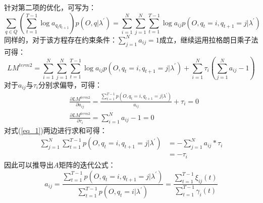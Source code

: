 \documentclass[UTF8, 12pt]{ctexart}
\begin{document}
	针对第二项的优化，可写为：
	\begin{equation}
		\sum_{q \in Q} ({\sum_{t=1}^{T-1}{\log a_{q_{t}q_{t+1}}}})p(O,q|\lambda^{'}) = \sum_{i=1}^{N} \sum_{j=1}^{N} \sum_{t=1}^{T-1}\log a_{ij} p(O, q_{t}=i, q_{t+1}=j|\lambda^{'})
	\end{equation}
	同样的，对于该方程存在约束条件：$\sum_{j=1}^{N} a_{ij}=1$成立，继续运用拉格朗日乘子法可得：
	\begin{equation}
		LM^{term2} = \sum_{i=1}^{N} \sum_{j=1}^{N} \sum_{t=1}^{T-1}\log a_{ij} p(O, q_{t}=i, q_{t+1}=j|\lambda^{'}) +  \sum_{i=1}^{N} \tau_{i} ({\sum_{j=1}^{N} a_{ij} - 1})
	\end{equation}
	对于$a_{ij}$与$\tau_{i}$分别求偏导，可得：
	\begin{align}
		\label{eq_1}
		& \frac{\partial LM^{term2}}{\partial a_{ij}} = \frac{\sum_{t=1}^{T-1} p(O, q_{t}=i, q_{t+1}=j|\lambda^{'})}{a_{ij}} + \tau_{i} = 0 \\
		& \frac{\partial LM^{term2}}{\partial \tau_{i}} = \sum_{i=1}^{N} a_{ij} - 1 = 0
	\end{align}
	对式(\ref{eq_1})两边进行求和可得：
	\begin{align}
		\sum_{j=1}^{N}\sum_{t=1}^{T-1} p(O, q_{t}=i, q_{t+1}=j|\lambda^{'}) & = - \sum_{j=1}^{N} {a_{ij} * \tau_{i}} \\
																			& = - \tau_{i}
	\end{align}
	因此可以推导出$A$矩阵的迭代公式：
	\begin{equation}
		\label{A_update}
		a_{ij} = \frac{\sum_{t=1}^{T-1} p(O, q_{t}=i, q_{t+1}=j|\lambda^{'})}{\sum_{t=1}^{T-1} p(O, q_{t}=i|\lambda^{'})} = \frac{\sum_{t=1}^{T-1}{\xi_{ij}(t) }}{\sum_{t=1}^{T-1}{\gamma_{i}(t)}}
	\end{equation}
\end{document}
